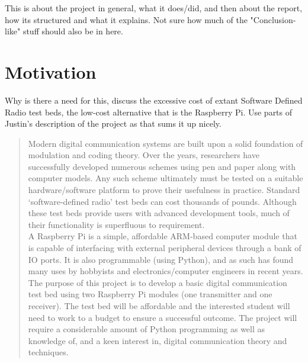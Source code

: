 \documentclass[../main.tex]{subfiles}
\begin{document}
This is about the project in general, what it does/did, and then about the report, how its structured and what it explains. Not sure how much of the "Conclusion-like" stuff should also be in here.



\section{Motivation}

Why is there a need for this, discuss the excessive cost of extant Software Defined Radio test beds, the low-cost alternative that is the Raspberry Pi. Use parts of Justin's description of the project as that sums it up nicely.

\begin{quotation}
	Modern digital communication systems are built upon a solid foundation of modulation and coding theory.
	Over the years, researchers have successfully developed numerous schemes using pen and paper along with computer models.
	Any such scheme ultimately must be tested on a suitable hardware/software platform to prove their usefulness in practice.
	Standard ‘software-defined radio’ test beds can cost thousands of pounds.
	Although these test beds provide users with advanced development tools, much of their functionality is superfluous to requirement.\\
	
	A Raspberry Pi is a simple, affordable ARM-based computer module that is capable of interfacing with external peripheral devices through a bank of IO ports.
	It is also programmable (using Python), and as such has found many uses by hobbyists and electronics/computer engineers in recent years.
	The purpose of this project is to develop a basic digital communication test bed using two Raspberry Pi modules (one transmitter and one receiver).
	The test bed will be affordable and the interested student will need to work to a budget to ensure a successful outcome.
	The project will require a considerable amount of Python programming as well as knowledge of, and a keen interest in, digital communication theory and techniques.
\end{quotation}


\end{document}
